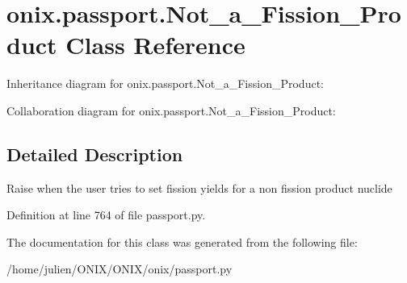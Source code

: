 \hypertarget{classonix_1_1passport_1_1Not__a__Fission__Product}{}\section{onix.\+passport.\+Not\+\_\+a\+\_\+\+Fission\+\_\+\+Product Class Reference}
\label{classonix_1_1passport_1_1Not__a__Fission__Product}


Inheritance diagram for onix.\+passport.\+Not\+\_\+a\+\_\+\+Fission\+\_\+\+Product\+:


Collaboration diagram for onix.\+passport.\+Not\+\_\+a\+\_\+\+Fission\+\_\+\+Product\+:


\subsection{Detailed Description}
\begin{DoxyVerb}Raise when the user tries to set fission yields for a non fission product nuclide \end{DoxyVerb}
 

Definition at line 764 of file passport.\+py.



The documentation for this class was generated from the following file\+:\begin{DoxyCompactItemize}
\item 
/home/julien/\+O\+N\+I\+X/\+O\+N\+I\+X/onix/passport.\+py\end{DoxyCompactItemize}
